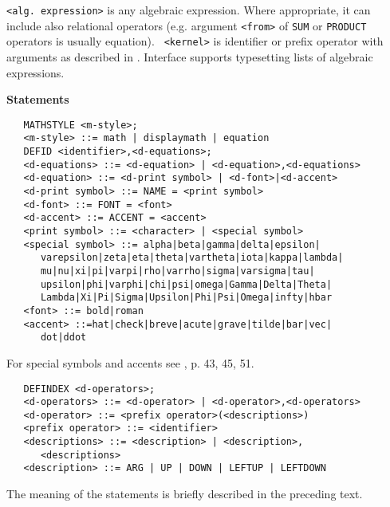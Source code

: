 {\tt <alg. expression>} is any algebraic expression. Where appropriate,
it can include also relational operators (e.g. argument {\tt <from>} of
{\tt SUM} or {\tt PRODUCT} operators is usually equation). {\tt
<kernel>} is identifier or prefix operator with arguments as described
in \cite{Hearn:91}. Interface supports typesetting lists of algebraic
expressions.


{\bf Statements}

\begin{verbatim}
   MATHSTYLE <m-style>;
   <m-style> ::= math | displaymath | equation
   DEFID <identifier>,<d-equations>;
   <d-equations> ::= <d-equation> | <d-equation>,<d-equations>
   <d-equation> ::= <d-print symbol> | <d-font>|<d-accent>
   <d-print symbol> ::= NAME = <print symbol>
   <d-font> ::= FONT = <font>
   <d-accent> ::= ACCENT = <accent>
   <print symbol> ::= <character> | <special symbol>
   <special symbol> ::= alpha|beta|gamma|delta|epsilon|
      varepsilon|zeta|eta|theta|vartheta|iota|kappa|lambda|
      mu|nu|xi|pi|varpi|rho|varrho|sigma|varsigma|tau|
      upsilon|phi|varphi|chi|psi|omega|Gamma|Delta|Theta|
      Lambda|Xi|Pi|Sigma|Upsilon|Phi|Psi|Omega|infty|hbar
   <font> ::= bold|roman
   <accent> ::=hat|check|breve|acute|grave|tilde|bar|vec|
      dot|ddot
\end{verbatim}

For special symbols and accents see \cite{Lamport:86}, p. 43, 45, 51.

\begin{verbatim}
   DEFINDEX <d-operators>;
   <d-operators> ::= <d-operator> | <d-operator>,<d-operators>
   <d-operator> ::= <prefix operator>(<descriptions>)
   <prefix operator> ::= <identifier>
   <descriptions> ::= <description> | <description>,
      <descriptions>
   <description> ::= ARG | UP | DOWN | LEFTUP | LEFTDOWN
\end{verbatim}

The meaning of the statements is briefly described in the preceding
text.


